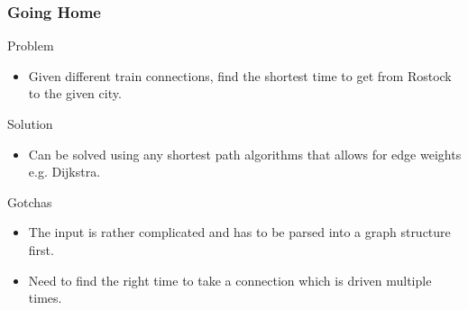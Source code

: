 \documentclass{beamer}
\begin{document}
\begin{frame}
    \frametitle{Going Home}
    \begin{block}{Problem}
        \begin{itemize}
            \item Given different train connections, find the shortest time to get from Rostock to the given city.
        \end{itemize}
    \end{block}
    \begin{block}{Solution}
        \begin{itemize}
            \item Can be solved using any shortest path algorithms that allows for edge weights e.g. Dijkstra.
        \end{itemize}
    \end{block}
    \begin{block}{Gotchas}
        \begin{itemize}
            \item The input is rather complicated and has to be parsed into a graph structure first.
            \item Need to find the right time to take a connection which is driven multiple times.
        \end{itemize}
    \end{block}
\end{frame}
\end{document}
